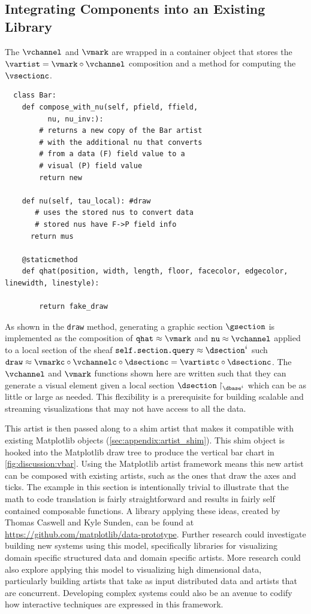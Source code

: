 \documentclass[review]{vgtc}
\theoremstyle{definition}
\theoremstyle{remark}
\begin{document}
\subsection{Integrating Components into an Existing Library}
The $\vchannel$ and $\vmark$ are wrapped in a container object that stores the $\vartist = \vmark \circ \vchannel$ composition and a method for computing the $\vsectionc$.
\begin{verbatim}
  class Bar:
    def compose_with_nu(self, pfield, ffield,
          nu, nu_inv:):
        # returns a new copy of the Bar artist
        # with the additional nu that converts
        # from a data (F) field value to a
        # visual (P) field value
        return new

    def nu(self, tau_local): #draw
       # uses the stored nus to convert data
       # stored nus have F->P field info
      return mus

    @staticmethod
    def qhat(position, width, length, floor, facecolor, edgecolor, linewidth, linestyle):

        return fake_draw
\end{verbatim}

As shown in the \texttt{draw} method, generating a graphic section $\gsection$ is implemented as the composition of $\texttt{qhat} \approx \vmark$ and $\texttt{nu} \approx \vchannel$ applied to a local section of the sheaf $\texttt{self.section.query} \approx \dsection^{i}$ such  $\texttt{draw} \approx \vmarkc\circ\vchannelc\circ\dsectionc  = \vartistc\circ \dsectionc$. The $\vchannel$ and $\vmark$ functions shown here are written such that they can generate a visual element given a local section $\dsection\restriction_{\dbase^{i}}$ which can be as little or large as needed. This flexibility is a prerequisite for building scalable and streaming visualizations that may not have access to all the data.

This artist is then passed along to a shim artist that makes it compatible with existing Matplotlib objects (\autoref{sec:appendix:artist_shim}). This shim object is hooked into the Matplotlib draw tree to produce the vertical bar chart in \autoref{fig:discussion:vbar}. Using the Matplotlib artist framework means this new artist can be composed with existing artists, such as the ones that draw the axes and ticks. The example in this section is intentionally trivial to illustrate that the math to code translation is fairly straightforward and results in fairly self contained composable functions. A library applying these ideas, created by Thomas Caswell and Kyle Sunden, can be found at \url{https://github.com/matplotlib/data-prototype}. Further research could investigate building new systems using this model, specifically libraries for visualizing domain specific structured data and domain specific artists. More research could also explore applying this model to visualizing high dimensional data, particularly building artists that take as input distributed data and artists that are concurrent. Developing complex systems could also be an avenue to codify how interactive techniques are expressed in this framework.
\end{document}
